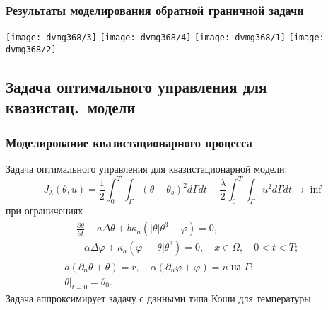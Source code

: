 \begin{frame}
    \frametitle{Результаты моделирования обратной граничной задачи}
    \centering
    \texttt{[image: dvmg368/3]}
    \texttt{[image: dvmg368/4]}
    \texttt{[image: dvmg368/1]}
    \texttt{[image: dvmg368/2]}
\end{frame}

\subsection{Задача оптимального управления для квазистац.\ модели}\label{quasi-solve}
\begin{frame}
    \frametitle{Моделирование квазистационарного процесса}
    Задача оптимального управления для квазистационарной модели:
    \begin{equation*}
        J_{\lambda}(\theta, u)=\frac{1}{2} \int_{0}^{T}
        \int_{\Gamma}\left(\theta-\theta_{b}\right)^{2} d \Gamma d t+\frac{\lambda}{2}
        \int_{0}^{T} \int_{\Gamma} u^{2} d \Gamma d t \rightarrow \inf
    \end{equation*}
    при ограничениях
    \begin{gather*}
        \begin{split}
            & \frac{\partial \theta}{\partial t} - a \Delta \theta
            + b \kappa_{a} \left(|\theta| \theta^{3}-\varphi\right) = 0,\\
            & - \alpha \Delta \varphi
            + \kappa_{a} \left(\varphi-|\theta| \theta^{3}\right) = 0,
            \quad x \in \Omega, \quad 0 < t < T;
        \end{split}\\
        a \left(\partial_{n} \theta+\theta\right)=r,
        \quad \alpha\left(\partial_{n} \varphi
        + \varphi\right) = u \text { на } \Gamma;\\
        \left.\theta\right|_{t=0} = \theta_{0}.
    \end{gather*}
    Задача аппроксимирует задачу с данными типа Коши для температуры.
\end{frame}

